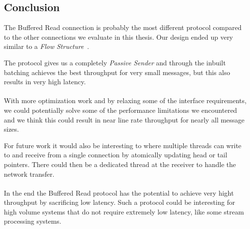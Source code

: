 \subsection{Conclusion}
The Buffered Read connection is probably the most different protocol compared to the other connections we evaluate in this
thesis. Our design ended up very similar to a \emph{Flow Structure}~\cite{sharma2020design}.

The protocol gives us a completely \emph{Passive Sender} and through the inbuilt batching achieves the best throughput for 
very small messages, but this also results in very high latency.

\paragraph{} With more optimization work and by relaxing some of the interface requirements, we could potentially solve 
some of the performance limitations we encountered and we think this could result in near line rate throughput for nearly 
all message sizes.

For future work it would also be interesting to where multiple threads can write to and receive from a single connection 
by atomically updating head or tail pointers. There could then be a dedicated thread at the receiver to handle the network
transfer.

\paragraph{} In the end the Buffered Read protocol has the potential to achieve very hight throughput by sacrificing low 
latency. Such a protocol could be interesting for high volume systems that do not require extremely low latency, like some
stream processing systems.

